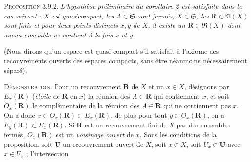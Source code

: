 \textsc{Proposition 3.9.2.} \textit{L'hypothèse préliminaire du
corollaire \textup{2} est satisfaite dans le cas suivant : $X$ est quasicompact, les
$A\in\mathfrak S$ sont fermés, $X\in\mathfrak S$, les
$\mathbf R\in\mathfrak R(X)$ sont finis et pour deux points distincts $x,y$
de $X$, il existe un $\mathbf R\in\mathfrak R(X)$ dont aucun ensemble ne
contient à la fois $x$ et $y$.}

(Nous dirons qu'un espace est quasi-compact s'il satisfait à l'axiome des
recouvrements ouverts des espaces compacts, sans être néanmoins nécessairement
séparé).

\textsc{Démonstration.} Pour un recouvrement $\mathbf R$ de $X$ et un
$x\in X$, désignons par $E_x(\mathbf R)$ (\emph{étoile} de $\mathbf R$ en $x$) la
réunion des $A\in\mathbf R$ qui contiennent $x$, et soit $O_x(\mathbf R)$ le
complémentaire de la réunion des $A\in\mathbf R$ qui ne contiennent pas $x$.
On a donc $x\in O_x(\mathbf R)\subset E_x(\mathbf R)$, de plus pour tout
$y\in O_x(\mathbf R)$, on a $E_y(\mathbf R)\subset E_x(\mathbf R)$.
Si $\mathbf R$ est un recouvrement fini de $X$ par des ensembles fermés,
$O_x(\mathbf R)$ est un \textit{voisinage ouvert} de $x$.
Sous les conditions de la proposition, soit $\mathbf U$ un recouvrement
ouvert de $X$, soit $x\in X$, soit $U_x\in\mathbf U$ avec $x\in U_x$ ;
l'intersection

